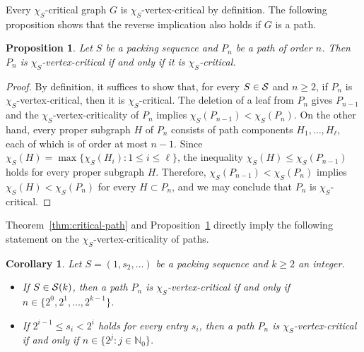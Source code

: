 \documentclass[12pt]{article}
\newtheorem{proposition}[theorem]{Proposition}
\newtheorem{corollary}[theorem]{Corollary}
\newtheorem{remark}[theorem]{Remark}
\newcommand{\cS}{{\cal S}}
\begin{document}
 Every $\chi_S$-critical graph $G$ is $\chi_S$-vertex-critical by definition. The following proposition shows that the reverse implication also holds if $G$ is a path.
  \begin{proposition} \label{prop:critical-path}
      Let $S$ be a packing sequence and $P_n$ be a path of order $n$. Then $P_n$ is $\chi_S$-vertex-critical if and only if it is $\chi_S$-critical.
  \end{proposition}
  \begin{proof} By definition, it suffices to show that, for every $S \in \cS$ and $n \ge 2$, if  $P_n$ is $\chi_S$-vertex-critical, then it is $\chi_S$-critical.   
  The deletion of a leaf from $P_n$ gives $P_{n-1}$ and the $\chi_S$-vertex-criticality of $P_n$ implies $\chi_S(P_{n-1}) < \chi_S(P_n)$. On the other hand, every proper subgraph $H$ of $P_n$ consists of path components $H_1, \dots, H_\ell$, each of which is of order at most $n-1$. Since $\chi_S(H) = \max \{\chi_S(H_i) \colon 1 \le i \le \ell\}$, the inequality $\chi_S(H) \leq \chi_S(P_{n-1}) $ holds for every proper subgraph $H$. Therefore, $\chi_S(P_{n-1}) < \chi_S(P_n)$ implies $\chi_S(H) < \chi_S(P_n)$ for every $H \subset P_n$, and we may conclude that $P_n$ is $\chi_S$-critical.
  \end{proof}
  Theorem~\ref{thm:critical-path} and Proposition~\ref{prop:critical-path}  directly imply the following statement on the $\chi_S$-vertex-criticality of paths.
  \begin{corollary} \label{cor:vertex-crit-path}
     Let $S=(1,s_2, \dots)$ be a packing sequence and $k \ge 2$ an integer. 
 \begin{itemize}
     \item[(i)] If $S \in \cS(k)$, then a path $P_n$ is $\chi_S$-vertex-critical if and only if $n \in \{2^0, 2^1, \dots, \allowbreak 2^{k-1}\}$.
     \item[(ii)] If $2^{i-1} \le s_i < 2^i$ holds for every entry $s_i$, then a path $P_n$ is $\chi_S$-vertex-critical if and only if $n \in \{2^j \colon  j \in \mathbb{N}_{0}\}$.
 \end{itemize} 
  \end{corollary}
  
   
   
\end{document}
